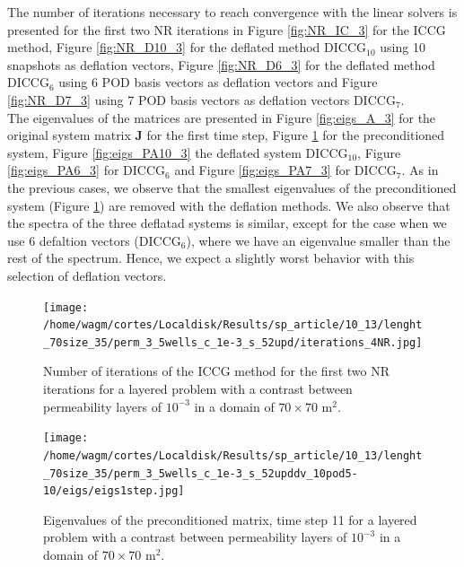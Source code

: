 \documentclass[12pt]{article}
\begin{document}
 The number of iterations necessary to reach convergence with the linear solvers is presented for the first two NR iterations in Figure \ref{fig:NR_IC_3} for the ICCG method, Figure \ref{fig:NR_D10_3} for the deflated method DICCG$_{10}$ using 10 snapshots as deflation vectors, Figure \ref{fig:NR_D6_3} for the deflated method DICCG$_6$ using 6 POD basis vectors as deflation vectors and Figure \ref{fig:NR_D7_3} using 7 POD basis vectors as deflation vectors DICCG$_7$.\\
The eigenvalues of the matrices are presented in Figure \ref{fig:eigs_A_3} for the original system matrix $\mathbf{J}$ for the first time step, Figure \ref{fig:eigs_MA_3} for the preconditioned system, Figure \ref{fig:eigs_PA10_3} the deflated system DICCG$_{10}$, Figure \ref{fig:eigs_PA6_3} for DICCG$_6$ and Figure \ref{fig:eigs_PA7_3} for DICCG$_7$. As in the previous cases, we observe that the smallest eigenvalues of the preconditioned system (Figure \ref{fig:eigs_MA_3}) are removed with the deflation methods. We also observe that the spectra of the three deflatad systems is similar, except for the case when we use 6 defaltion vectors (DICCG$_6$), where we have an eigenvalue smaller than the rest of the spectrum. Hence, we expect a slightly worst behavior with this selection of deflation vectors. \\


\begin{figure}[!h]
\centering
\begin{minipage}{.4\textwidth}
\vspace{-0.9cm}
\hspace{-1cm}
\texttt{[image: /home/wagm/cortes/Localdisk/Results/sp\_article/10\_13/lenght\_70size\_35/perm\_3\_5wells\_c\_1e-3\_s\_52upd/iterations\_4NR.jpg]}
\vspace{-1.3cm}
\caption{Number of iterations of the ICCG method for the first two NR iterations for a layered problem with a contrast between permeability layers of $10^{-3}$ in a domain of $70 \times 70$ m$^2$.}
\label{fig:NR_IC_3}
\end{minipage}%
\hspace{15mm}
\begin{minipage}{.4\textwidth}
 \centering
 \vspace{-5mm}
\texttt{[image: /home/wagm/cortes/Localdisk/Results/sp\_article/10\_13/lenght\_70size\_35/perm\_3\_5wells\_c\_1e-3\_s\_52upddv\_10pod5-10/eigs/eigs1step.jpg]}
\caption{Eigenvalues of the preconditioned matrix, time step 11 for a layered problem with a contrast between permeability layers of $10^{-3}$ in a domain of $70 \times 70$ m$^2$.}
\label{fig:eigs_MA_3}
\end{minipage}
\end{figure}
\end{document}

